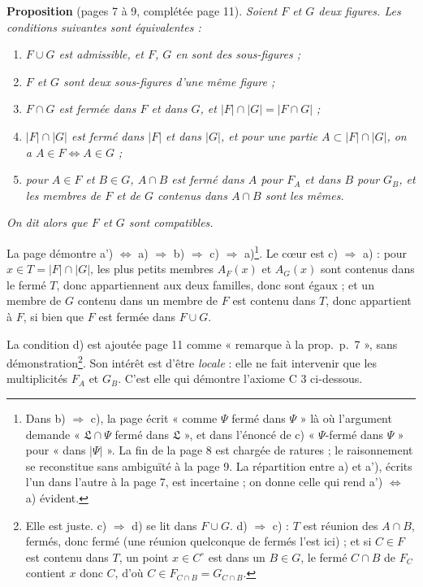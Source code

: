 \documentclass[11pt,a4paper]{article}
\begin{document}
\textbf{Proposition} (pages 7 à 9, complétée page 11). \emph{Soient $F$ et $G$
deux figures. Les conditions suivantes sont équivalentes :}
\begin{enumerate}
\item[a)] \emph{$F \cup G$ est admissible, et $F$, $G$ en sont des sous-figures
;}
\item[a')] \emph{$F$ et $G$ sont deux sous-figures d'une même figure ;}
\item[b)] \emph{$F \cap G$ est fermée dans $F$ et dans $G$, et $|F| \cap |G| =
|F \cap G|$ ;}
\item[c)] \emph{$|F| \cap |G|$ est fermé dans $|F|$ et dans $|G|$, et pour une
partie $A \subset |F| \cap |G|$, on a $A \in F \iff A \in G$ ;}
\item[d)] \emph{pour $A \in F$ et $B \in G$, $A \cap B$ est fermé dans $A$ pour
$F_{A}$ et dans $B$ pour $G_{B}$, et les membres de $F$ et de $G$ contenus dans
$A \cap B$ sont les mêmes.}
\end{enumerate}
\emph{On dit alors que $F$ et $G$ sont \emph{compatibles}.}

La page démontre a') $\Leftrightarrow$ a) $\Rightarrow$ b) $\Rightarrow$ c)
$\Rightarrow$ a)\footnote{Dans b) $\Rightarrow$ c), la page écrit « comme
$\Psi$ fermé dans $\Psi$ » là où l'argument demande « $\mathfrak{L} \cap \Psi$
fermé dans $\mathfrak{L}$ », et dans l'énoncé de c) « $\Psi$-fermé dans $\Psi$ »
pour « dans $|\Psi|$ ». La fin de la page 8 est chargée de ratures ; le
raisonnement se reconstitue sans ambiguïté à la page 9. La répartition entre a)
et a'), écrits l'un dans l'autre à la page 7, est incertaine ; on donne celle
qui rend a') $\Leftrightarrow$ a) évident.}. Le cœur est c) $\Rightarrow$ a) :
pour $x \in T = |F| \cap |G|$, les plus petits membres $A_{F}(x)$ et $A_{G}(x)$
sont contenus dans le fermé $T$, donc appartiennent aux deux familles, donc
sont égaux ; et un membre de $G$ contenu dans un membre de $F$ est contenu dans
$T$, donc appartient à $F$, si bien que $F$ est fermée dans $F \cup G$.

La condition d) est ajoutée page 11 comme « remarque à la prop.\ p.~7 », sans
démonstration\footnote{Elle est juste. c) $\Rightarrow$ d) se lit dans $F \cup
G$. d) $\Rightarrow$ c) : $T$ est réunion des $A \cap B$, fermés, donc fermé
(une réunion quelconque de fermés l'est ici) ; et si $C \in F$ est contenu dans
$T$, un point $x \in C^{\circ}$ est dans un $B \in G$, le fermé $C \cap B$ de
$F_{C}$ contient $x$ donc $C$, d'où $C \in F_{C \cap B} = G_{C \cap B}$.}. Son
intérêt est d'être \emph{locale} : elle ne fait intervenir que les
multiplicités $F_{A}$ et $G_{B}$. C'est elle qui démontre l'axiome C 3
ci-dessous.
\end{document}

